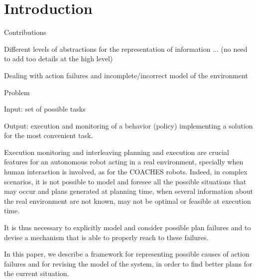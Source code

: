 \section{Introduction}

Contributions

Different levels of abstractions for the representation of information ...
(no need to add too details at the high level)


Dealing with action failures and incomplete/incorrect model of the environment


Problem

Input: set of possible tasks

Output: execution and monitoring of a behavior (policy) implementing a solution for the most convenient task.




Execution monitoring and interleaving planning and execution are crucial features for an autonomous robot acting in a real environment, specially when human interaction is involved, 
as for the COACHES robots. Indeed, in complex scenarios, it is not possible to model and foresee all the possible situations that may occur and plans generated at planning time, when several information about the real environment are not known, may not be optimal or feasible at execution time.




It is thus necessary to explicitly model and consider possible plan failures and to devise a mechanism that is able to properly reach to these failures.

In this paper, we describe a framework for representing possible causes of action failures and for revising the model of the system, in order to find better plans for the current situation.
